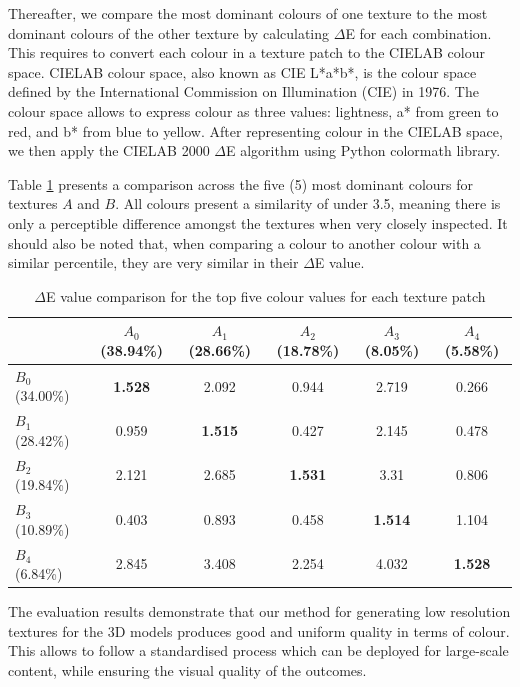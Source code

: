 \documentclass[acmlarge,screen,dvipsnames]{acmart}
\begin{document}
Thereafter, we compare
the most dominant colours of one texture to the most dominant colours of the other
texture by calculating $\Delta$E for each combination. This requires to convert each colour in a texture
patch to the CIELAB colour space. CIELAB colour space,
also known as CIE L*a*b*, is the colour space defined by the International Commission on Illumination (CIE) in 1976. The colour space allows to express colour as
three values: lightness, a* from green to red, and b* from blue to yellow. After 
representing colour in the CIELAB space, we then apply the 
CIELAB 2000 $\Delta$E algorithm using Python colormath library. 

Table \ref{tab:delta} presents a comparison across the five (5) most dominant colours for textures $ A $ and $ B $. 
All colours present a similarity of under 3.5, meaning there is only a perceptible difference amongst the textures when very closely inspected. It should also be noted that, when comparing a colour to another colour with a similar percentile, they are very similar in their $\Delta$E value. 

\begin{table}[h]
\begin{tabular}{ | l | c | c | c | c | c |}
\toprule
  & $ A_0 $ (38.94\%)  & $ A_1 $ (28.66\%) & $ A_2 $ (18.78\%)& $ A_3 $ (8.05\%) & $ A_4 $ (5.58\%)  \\ 
\midrule
 $ B_0 $ (34.00\%) & \textbf{1.528} & 2.092 & 0.944 & 2.719 & 0.266  \\ 
 $ B_1 $ (28.42\%)& 0.959 & \textbf{1.515} & 0.427 & 2.145 & 0.478  \\ 
 $ B_2 $ (19.84\%)& 2.121 & 2.685 & \textbf{1.531} & 3.31 &  0.806 \\ 
 $ B_3 $ (10.89\%) & 0.403 & 0.893 & 0.458 & \textbf{1.514} & 1.104  \\ 
 $ B_4 $ (6.84\%) & 2.845 & 3.408 & 2.254 & 4.032 & \textbf{1.528}  \\ 
\bottomrule
\end{tabular}
\caption{$\Delta$E value comparison for the top five colour values for each texture patch}
\label{tab:delta} 
\end{table}

The evaluation results demonstrate that our method for generating 
low resolution textures for the 3D models produces good and uniform quality 
in terms of colour. This allows to
follow a standardised process which can be deployed for large-scale
content, while ensuring the visual quality of the outcomes.
\color{black}
\end{document}
